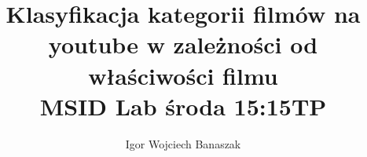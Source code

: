 \begin{frontmatter}
%
\title{%
Klasyfikacja kategorii filmów na youtube w zależności od właściwości filmu\\
\small MSID Lab środa 15:15TP
}
%
\author[Igor]{Igor Wojciech Banaszak}

\renewcommand*{\today}{\DayMonthYearDateFormat\displaydate{dateName}} 
\end{frontmatter}
